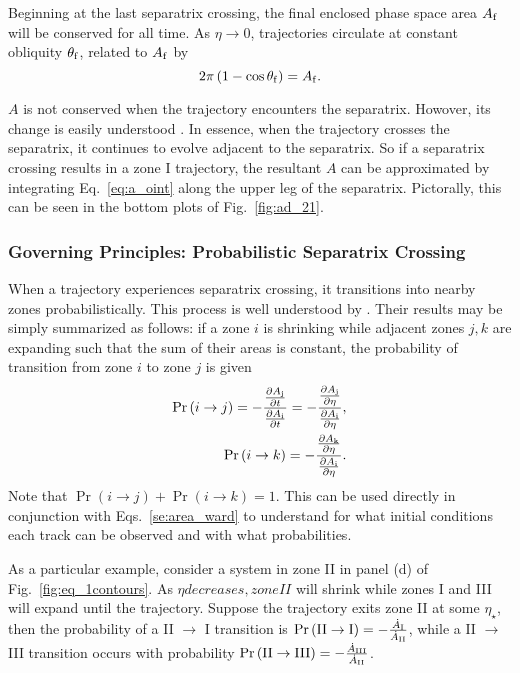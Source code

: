 \documentclass[
        fleqn,
        usenatbib,
        referee,
    ]{mnras}
\newcommand*{\pd}[2]{\frac{\partial#1}{\partial#2}}
\newcommand*{\p}[1]{\left(#1\right)}
\begin{document}
Beginning at the last separatrix crossing, the final enclosed phase space area
$A_{\rm f}$ will be conserved for all time. As $\eta \to 0$, trajectories circulate at
constant obliquity $\theta_{\rm f}$, related to $A_{\rm f}$ by
\begin{equation}
    2\pi\p{1 - \cos \theta_{\rm f}} = A_{\rm f}. \label{eq:qfaf}
\end{equation}

$A$ is not conserved when the trajectory encounters the separatrix. Howover, its
change is easily understood \citep{henrard1982}. In essence, when the trajectory
crosses the separatrix, it continues to evolve adjacent to the separatrix. So if
a separatrix crossing results in a zone I trajectory, the resultant $A$ can be
approximated by integrating Eq.~\eqref{eq:a_oint} along the upper leg of the
separatrix. Pictorally, this can be seen in the bottom plots of
Fig.~\ref{fig:ad_21}.

\subsubsection{Governing Principles: Probabilistic Separatrix Crossing}

When a trajectory experiences separatrix crossing, it transitions into nearby
zones probabilistically. This process is well understood by
\citealp{henrard1982,henrard1987}. Their results may be simply summarized as
follows: if a zone $i$ is shrinking while adjacent zones $j, k$ are expanding
such that the sum of their areas is constant, the probability of transition from
zone $i$ to zone $j$ is given
\begin{align}
    \Pr\p{i \to j} = -\frac{\pd{A_{\rm j}}{t}}{ \pd{A_{\rm i}}{t}}
        = -\frac{\pd{A_{\rm j}}{\eta}}{ \pd{A_{\rm i}}{\eta}},\\
    \Pr\p{i \to k}
        = -\frac{\pd{A_{\rm k}}{\eta}}{ \pd{A_{\rm i}}{\eta}}.\label{eq:henrard_hop}
\end{align}
Note that $\Pr \p{i \to j} + \Pr\p{i \to k} = 1$. This can be used directly in
conjunction with Eqs.~\eqref{se:area_ward} to understand for what initial
conditions each track can be observed and with what probabilities.

As a particular example, consider a system in zone II in panel (d) of
Fig.~\ref{fig:eq_1contours}. As $\eta decreases, zone II$ will shrink while
zones I and III will expand until the trajectory. Suppose the trajectory
exits zone II at some $\eta_\star$, then the probability of a II $\to$ I
transition is $\Pr\p{\rm II \to I} = -\frac{\dot{A}_{\rm I}}{\dot{A}_{\rm II}}$,
while a II $\to$ III transition occurs with probability $\Pr\p{\rm II \to III} =
-\frac{\dot{A}_{\rm III}}{\dot{A}_{\rm II}}$.
\end{document}
